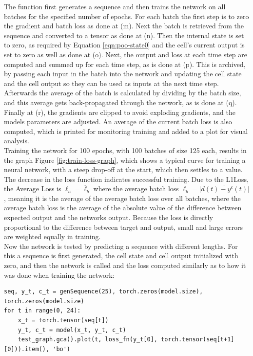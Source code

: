 \documentclass[twoside,a4paper,10pt,DIV=12,BCOR=12mm]{scrartcl}
\begin{document}
The function first generates a sequence and then trains the network on all batches for the specified number of epochs. For each batch the first step is to zero the gradient and batch loss as done at (m). Next the batch is retrieved from the sequence and converted to a tensor as done at (n). Then the internal state is set to zero, as required by Equation \ref{eqn:poo-state0} and the cell's current output is set to zero as well as done at (o). Next, the output and loss at each time step are computed and summed up for each time step, as is done at (p). This is archived, by passing each input in the batch into the network and updating the cell state and the cell output so they can be used as inputs at the next time step. Afterwards the average of the batch is calculated by dividing by the batch size, and this average gets back-propagated through the network, as is done at (q). Finally at (r), the gradients are clipped to avoid exploding gradients, and the models parameters are adjusted. An average of the current batch loss is also computed, which is printed for monitoring training and added to a plot for visual analysis.\cite{werb1990bptt, pytorch-rnn, gradient-clipping, pascanu2013rnntraining, hochreiter1997lstm}  
\\Training the network for 100 epochs, with 100 batches of size 125 each, results in the graph Figure \ref{fig:train-loss-graph}, which shows a typical curve for training a neural network, with a steep drop-off at the start, which then settles to a value.\cite{training-graphs}
The decrease in the loss function indicates successful training. Due to the L1Loss, the Average Loss is \begin{math}\ell_a=\overline \ell_b\end{math} where the average batch loss \begin{math}\ell_b=\overline{\left|d(t)-y^c(t)\right|}\end{math}, meaning it is the average of the average batch loss over all batches, where the average batch loss is the average of the absolute value of the difference between expected output and the networks output. Because the loss is directly proportional to the difference between target and output, small and large errors are weighted equally in training.\\
Now the network is tested by predicting a sequence with different lengths. For this a sequence is first generated, the  cell state and cell output initialized with zero, and then the network is called and the loss computed similarly as to how it was done when training the network:
\begin{lstlisting}
seq, y_t, c_t = genSequence(25), torch.zeros(model.size), torch.zeros(model.size)
for t in range(0, 24):
    x_t = torch.tensor(seq[t])
    y_t, c_t = model(x_t, y_t, c_t)
    test_graph.gca().plot(t, loss_fn(y_t[0], torch.tensor(seq[t+1][0])).item(), 'bo')
\end{lstlisting}
\end{document}
